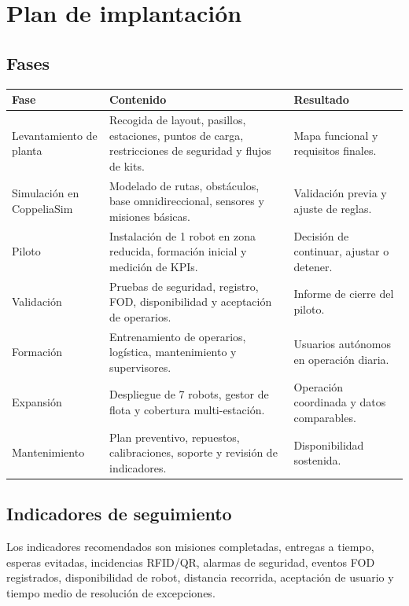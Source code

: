 \chapter{Plan de implantación}

\section{Fases}

\begin{longtable}{P{0.22\textwidth}P{0.52\textwidth}P{0.16\textwidth}}
\toprule
Fase & Contenido & Resultado\\
\midrule
\endhead
Levantamiento de planta & Recogida de layout, pasillos, estaciones, puntos de carga, restricciones de seguridad y flujos de kits. & Mapa funcional y requisitos finales.\\
Simulación en CoppeliaSim & Modelado de rutas, obstáculos, base omnidireccional, sensores y misiones básicas. & Validación previa y ajuste de reglas.\\
Piloto & Instalación de 1 robot en zona reducida, formación inicial y medición de KPIs. & Decisión de continuar, ajustar o detener.\\
Validación & Pruebas de seguridad, registro, FOD, disponibilidad y aceptación de operarios. & Informe de cierre del piloto.\\
Formación & Entrenamiento de operarios, logística, mantenimiento y supervisores. & Usuarios autónomos en operación diaria.\\
Expansión & Despliegue de 7 robots, gestor de flota y cobertura multi-estación. & Operación coordinada y datos comparables.\\
Mantenimiento & Plan preventivo, repuestos, calibraciones, soporte y revisión de indicadores. & Disponibilidad sostenida.\\
\bottomrule
\end{longtable}

\section{Indicadores de seguimiento}

Los indicadores recomendados son misiones completadas, entregas a tiempo, esperas evitadas, incidencias RFID/QR, alarmas de seguridad, eventos FOD registrados, disponibilidad de robot, distancia recorrida, aceptación de usuario y tiempo medio de resolución de excepciones.
